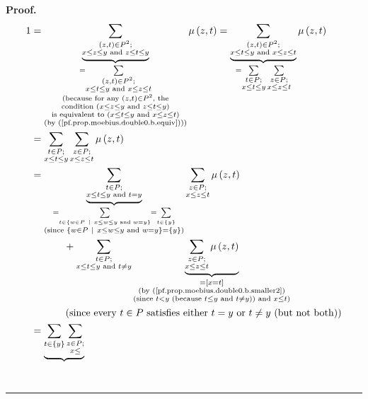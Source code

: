 \documentclass[numbers=enddot,12pt,final,onecolumn,notitlepage]{scrartcl}%
\theoremstyle{definition}
\newenvironment{proof}[1][Proof]{\noindent\textbf{#1.} }{\ \rule{0.5em}{0.5em}}
\newenvironment{verlong}{}{}
\let\sumnonlimits\sum
\renewcommand{\sum}{\sumnonlimits\limits}
\begin{document}
\begin{verlong}
\begin{proof}
\begin{align*}
1  &  =\underbrace{\sum_{\substack{\left(  z,t\right)  \in P^{2};\\x\leq z\leq
y\text{ and }z\leq t\leq y}}}_{\substack{=\sum_{\substack{\left(  z,t\right)
\in P^{2};\\x\leq t\leq y\text{ and }x\leq z\leq t}}\\\text{(because for any
}\left(  z,t\right)  \in P^{2}\text{, the}\\\text{condition }\left(  x\leq
z\leq y\text{ and }z\leq t\leq y\right)  \\\text{is equivalent to }\left(
x\leq t\leq y\text{ and }x\leq z\leq t\right)  \\\text{(by
(\ref{pf.prop.moebius.double0.b.equiv})))}}}\mu\left(  z,t\right)
=\underbrace{\sum_{\substack{\left(  z,t\right)  \in P^{2};\\x\leq t\leq
y\text{ and }x\leq z\leq t}}}_{=\sum_{\substack{t\in P;\\x\leq t\leq y}%
}\sum_{\substack{z\in P;\\x\leq z\leq t}}}\mu\left(  z,t\right) \\
&  =\sum_{\substack{t\in P;\\x\leq t\leq y}}\sum_{\substack{z\in P;\\x\leq
z\leq t}}\mu\left(  z,t\right) \\
&  =\underbrace{\sum_{\substack{t\in P;\\x\leq t\leq y\text{ and }t=y}%
}}_{\substack{=\sum_{t\in\left\{  w\in P\ \mid\ x\leq w\leq y\text{ and
}w=y\right\}  }=\sum_{t\in\left\{  y\right\}  }\\\text{(since }\left\{  w\in
P\ \mid\ x\leq w\leq y\text{ and }w=y\right\}  =\left\{  y\right\}  \text{)}%
}}\sum_{\substack{z\in P;\\x\leq z\leq t}}\mu\left(  z,t\right) \\
&  \ \ \ \ \ \ \ \ \ \ +\sum_{\substack{t\in P;\\x\leq t\leq y\text{ and
}t\neq y}}\underbrace{\sum_{\substack{z\in P;\\x\leq z\leq t}}\mu\left(
z,t\right)  }_{\substack{=\left[  x=t\right]  \\\text{(by
(\ref{pf.prop.moebius.double0.b.smaller2})}\\\text{(since }t<y\text{ (because
}t\leq y\text{ and }t\neq y\text{)) and }x\leq t\text{)}}}\\
&  \ \ \ \ \ \ \ \ \ \ \left(  \text{since every }t\in P\text{ satisfies
either }t=y\text{ or }t\neq y\text{ (but not both)}\right) \\
&  =\underbrace{\sum_{t\in\left\{  y\right\}  }\sum_{\substack{z\in P;\\x\leq
}}}
\end{align*}
\end{proof}
\end{verlong}
\end{document}
